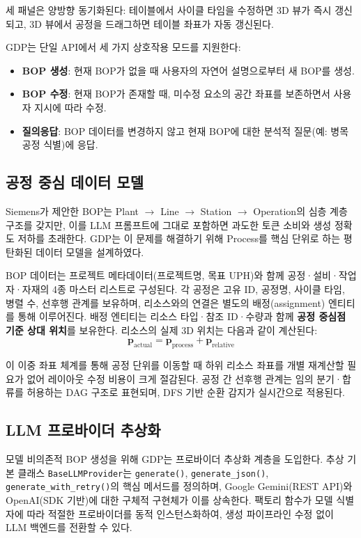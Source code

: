 세 패널은 양방향 동기화된다: 테이블에서 사이클 타임을 수정하면 3D 뷰가 즉시 갱신되고, 3D 뷰에서 공정을 드래그하면 테이블 좌표가 자동 갱신된다.

GDP는 단일 API에서 세 가지 상호작용 모드를 지원한다:
\begin{itemize}
    \item \textbf{BOP 생성}: 현재 BOP가 없을 때 사용자의 자연어 설명으로부터 새 BOP를 생성.
    \item \textbf{BOP 수정}: 현재 BOP가 존재할 때, 미수정 요소의 공간 좌표를 보존하면서 사용자 지시에 따라 수정.
    \item \textbf{질의응답}: BOP 데이터를 변경하지 않고 현재 BOP에 대한 분석적 질문(예: 병목 공정 식별)에 응답.
\end{itemize}

\subsection{공정 중심 데이터 모델}

Siemens가 제안한 BOP는 Plant $\rightarrow$ Line $\rightarrow$ Station $\rightarrow$ Operation의 심층 계층 구조를 갖지만, 이를 LLM 프롬프트에 그대로 포함하면 과도한 토큰 소비와 생성 정확도 저하를 초래한다. GDP는 이 문제를 해결하기 위해 Process를 핵심 단위로 하는 평탄화된 데이터 모델을 설계하였다.

BOP 데이터는 프로젝트 메타데이터(프로젝트명, 목표 UPH)와 함께 공정·설비·작업자·자재의 4종 마스터 리스트로 구성된다. 각 공정은 고유 ID, 공정명, 사이클 타임, 병렬 수, 선후행 관계를 보유하며, 리소스와의 연결은 별도의 배정(assignment) 엔티티를 통해 이루어진다. 배정 엔티티는 리소스 타입·참조 ID·수량과 함께 \textbf{공정 중심점 기준 상대 위치}를 보유한다. 리소스의 실제 3D 위치는 다음과 같이 계산된다:
\begin{equation}
\mathbf{p}_{\mathrm{actual}} = \mathbf{p}_{\mathrm{process}} + \mathbf{p}_{\mathrm{relative}}
\label{eq:coord}
\end{equation}

이 이중 좌표 체계를 통해 공정 단위를 이동할 때 하위 리소스 좌표를 개별 재계산할 필요가 없어 레이아웃 수정 비용이 크게 절감된다. 공정 간 선후행 관계는 임의 분기·합류를 허용하는 DAG 구조로 표현되며, DFS 기반 순환 감지가 실시간으로 적용된다.

\subsection{LLM 프로바이더 추상화}

모델 비의존적 BOP 생성을 위해 GDP는 프로바이더 추상화 계층을 도입한다. 추상 기본 클래스 \texttt{BaseLLMProvider}는 \texttt{generate()}, \texttt{generate\_json()}, \texttt{generate\_with\_retry()}의 핵심 메서드를 정의하며, Google Gemini(REST API)와 OpenAI(SDK 기반)에 대한 구체적 구현체가 이를 상속한다. 팩토리 함수가 모델 식별자에 따라 적절한 프로바이더를 동적 인스턴스화하여, 생성 파이프라인 수정 없이 LLM 백엔드를 전환할 수 있다.

